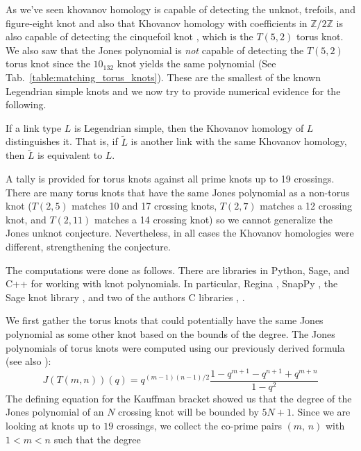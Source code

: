As we've seen khovanov homology is capable of detecting the
unknot, trefoils, and figure-eight knot and also that Khovanov homology with
coefficients in $\mathbb{Z}/2\mathbb{Z}$ is also capable of detecting
the cinquefoil knot \cite{BaldwinYingSivekCinquefoilKhovanov},
which is the $T(5,2)$ torus knot. We also saw that the Jones
polynomial is \textit{not} capable of detecting the
$T(5,2)$ torus knot since the $10_{132}$ knot yields the same
polynomial (See Tab.~\ref{table:matching_torus_knots}).
These are the smallest of the known Legendrian simple knots
and we now try to provide numerical evidence for the following.
\begin{conjecture}
    If a link type $L$ is Legendrian simple, then the Khovanov homology
    of $L$ distinguishes it. That is, if $\tilde{L}$
    is another link with the same Khovanov homology, then $\tilde{L}$ is
    equivalent to $L$.
\end{conjecture}
A tally is provided for torus knots against all prime knots up to 19 crossings.
There are many torus knots that have the same Jones polynomial as a non-torus
knot ($T(2,5)$ matches 10 and 17 crossing knots, $T(2,7)$
matches a 12 crossing knot, and $T(2,11)$ matches a 14 crossing knot)
so we cannot generalize the Jones unknot conjecture. Nevertheless, in
all cases the Khovanov homologies were different, strengthening the conjecture.
\par\hfill\par
The computations were done as follows. There are libraries in Python,
Sage, and C++ for working with knot polynomials. In particular,
Regina \cite{regina}, SnapPy \cite{SnapPy}, the Sage knot library
\cite{sage}, and two of the authors C libraries
\cite{MaguireJones}, \cite{MaguireLibtmpl}.
\par\hfill\par
We first gather the torus knots that could potentially have the same
Jones polynomial as some other knot based on the bounds of the degree.
The Jones polynomials of torus knots were computed using our previously
derived formula (see also \cite{jonesfordummyvjones}):
\begin{equation}
    \label{eqn:jones_poly_torus}%
    J(T(m,n))(q)=q^{(m-1)(n-1)/2}
        \frac{1-q^{m+1}-q^{n+1}+q^{m+n}}{1-q^{2}}
\end{equation}
The defining equation for the Kauffman bracket showed us that the degree of the
Jones polynomial of an $N$ crossing knot will be bounded by $5N+1$.
Since we are looking at knots up to $19$ crossings, we collect the
co-prime pairs $(m,\,n)$ with $1<m<n$ such that the degree
